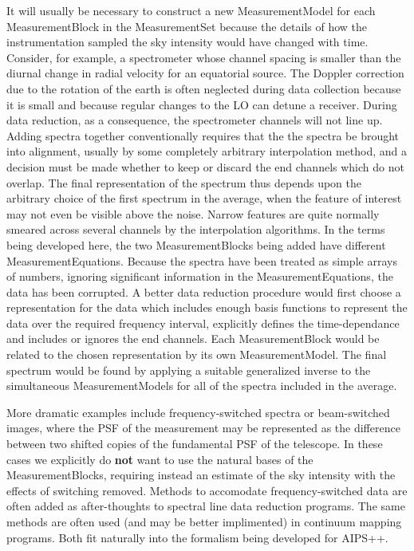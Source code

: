 It will usually be necessary to construct a new MeasurementModel for each 
MeasurementBlock in the MeasurementSet because the details of how the 
instrumentation sampled the sky intensity would have changed with time. 
Consider, for example, a 
spectrometer whose channel spacing is smaller than the diurnal
change in radial velocity for an equatorial source. The Doppler 
correction due to the rotation of the earth is often neglected during data 
collection because it is small and because regular changes to the LO can 
detune a receiver. During data reduction, as a consequence, the spectrometer 
channels will not line up. Adding spectra together conventionally requires 
that the the spectra be brought into alignment, usually by some 
completely arbitrary interpolation method, and a 
decision must be made whether to keep or discard the end channels which 
do not overlap. The final representation of the spectrum thus
depends upon the arbitrary choice of the first spectrum in the average, when
the feature of interest may not even be visible above the noise.  
Narrow features are quite normally smeared across several channels by the 
interpolation algorithms. In the terms being developed here, the two 
MeasurementBlocks being added have different MeasurementEquations. Because 
the spectra have been treated as simple arrays of numbers, ignoring significant
information in the MeasurementEquations, the data has been corrupted. A 
better data reduction procedure would first choose a representation for 
the data which includes enough basis functions to represent the data over 
the required frequency interval, explicitly defines the time-dependance and
includes or ignores the end channels. Each MeasurementBlock would be related to
the chosen representation by its own MeasurementModel.  The final spectrum 
would be found by applying a suitable generalized inverse to the simultaneous
MeasurementModels for all of the spectra included in the average.

More dramatic examples include frequency-switched spectra or beam-switched 
images, where the PSF of the measurement may be represented as the 
difference between two shifted copies of the fundamental PSF of the 
telescope. In these cases we explicitly do {\bf not} want to use the natural 
bases of the MeasurementBlocks, requiring instead an estimate of the sky 
intensity with the effects of switching removed. Methods to accomodate 
frequency-switched data are often added as after-thoughts to spectral line 
data reduction programs. The same methods are often used (and may be better
implimented) in continuum mapping programs. Both fit naturally into the
formalism being developed for AIPS++.

